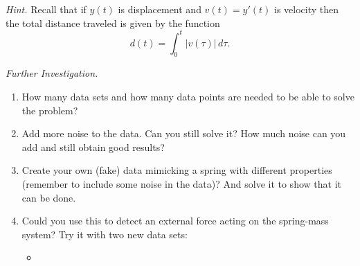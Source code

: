 %
%
%
%
%
%

\emph{Hint.} Recall that if $y(t)$ is displacement and $v(t) = y'(t)$ is velocity then the total distance traveled is given by the function
$$
d(t) = \int_0^t \big|v(\tau)\big| \, d\tau.
$$



\vfill



\emph{Further Investigation. } 
\begin{enumerate}[label=\emph{\arabic*.}]
\item How many data sets and how many data points are needed to be able to solve the problem?

\item Add more noise to the data. Can you still solve it? How much noise can you add and still obtain good results?

\item Create your own (fake) data mimicking a spring with different properties (remember to include some noise in the data)? And solve it to show that it can be done.

\item Could you use this to detect an external force acting on the spring-mass system? Try it with two new data sets: 
\begin{graybox}
\begin{itemize}
	\item {}	
\end{itemize}
\end{graybox}

\end{enumerate}

\begin{noexercises}
\end{noexercises}